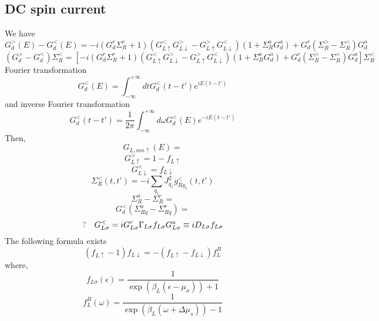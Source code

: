 \subsection{DC spin current}
We have
\begin{equation}
G_{d}^{>}(E)-G_{d}^{<}(E)=-i\left(G_{d}^{r} \Sigma_{R}^{r}+1\right)\left(G_{L \uparrow}^{<} G_{L \downarrow}^{>}-G_{L \uparrow}^{>} G_{L \downarrow}^{<}\right)\left(1+\Sigma_{R}^{a} G_{d}^{a}\right)+G_{d}^{r}\left(\Sigma_{R}^{>}-\Sigma_{R}^{<}\right) G_{d}^{a}
\end{equation}
\begin{equation}
\left(G_{d}^{>}-G_{d}^{<}\right) \Sigma_{R}^{<} = \left[-i\left(G_{d}^{r} \Sigma_{R}^{r}+1\right)\left(G_{L \uparrow}^{<} G_{L \downarrow}^{>}-G_{L \uparrow}^{>} G_{L \downarrow}^{<}\right)\left(1+\Sigma_{R}^{a} G_{d}^{a}\right)+G_{d}^{r}\left(\Sigma_{R}^{>}-\Sigma_{R}^{<}\right) G_{d}^{a} \right]\Sigma_{R}^{<}
\end{equation}
Fourier transformation
\begin{equation}
G_{d}^{<}(E) = \int_{-\infty}^{+\infty} dt G_{d}^{<}(t-t')e^{iE(t-t')}
\end{equation}
and inverse Fourier transformation
\begin{equation}
G_{d}^{<}(t-t') = \frac{1}{2\pi}\int_{-\infty}^{+\infty} d\omega G_{d}^{<}(E)e^{-iE(t-t')}
\end{equation}
Then,
\begin{equation}
  \label{eq:3}
G_{L,mn\uparrow}(E) = 
\end{equation}
\begin{equation}
  \label{eq:3}
G_{L \uparrow}^{>} = 1- f_{L\uparrow}
\end{equation}
\begin{equation}
G_{L\downarrow}^{<} = f_{L\downarrow}
\end{equation}
\begin{equation}
\Sigma_{R}^{<}(t, t') = -i\sum_{q_{1}} J_{q_{1}}^{2} g_{Rq_{1}}^{<}(t, t')
\end{equation}
\begin{equation}
\Sigma_{R}^{a} - \Sigma_{R}^{r} = 
\end{equation}
\begin{equation}
G_{d}^{<}\left(\Sigma_{R q}^{a}-\Sigma_{R q}^{r}\right) = 
\end{equation}
\begin{equation}
{\color{red}{\Large{?}}}\quad G_{L \sigma}^{<}=i G_{L \sigma}^{r} \Gamma_{L \sigma} f_{L \sigma} G_{L \sigma}^{a} \equiv i D_{L \sigma} f_{L \sigma}
\end{equation}
The following formula exists
\begin{equation}
\left(f_{L \uparrow}-1\right) f_{L \downarrow}=-\left(f_{L \uparrow}-f_{L \downarrow}\right) f_{L}^{B}
\end{equation}
where,
\begin{equation}
f_{L \sigma}(\epsilon)=\frac{1}{\exp \left(\beta_{L}\left(\epsilon-\mu_{\sigma}\right)\right)+1}
\end{equation}
\begin{equation}
f_{L}^{B}(\omega)= \frac{1}{\exp \left(\beta_{L}\left(\omega+\Delta \mu_{s}\right)\right)-1}
\end{equation}
